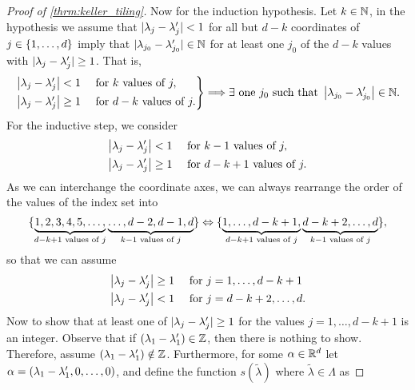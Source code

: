 \documentclass[../thesis.tex]{subfiles}
\begin{document}
\begin{proof}[Proof of \cref{thrm:keller_tiling}]
    Now for the induction hypothesis. Let $k\in \mathbb{N}$, in the hypothesis we assume that $|\lambda_{j}-\lambda_{j}'| < 1$ for all but $d-k$ coordinates of $j\in\{1,\dots, d\}$ imply that $|\lambda_{j_0}-\lambda_{j_0}'| \in \mathbb{N}$ for at least one $j_0$ of the $d-k$ values with $|\lambda_{j}-\lambda_{j}'| \geq 1$. That is,
    \begin{align*}
        \begin{rcases}
            \left|\lambda_{j}-\lambda_{j}'\right| < 1 & \text{ for $k$ values of } j , \\
            \left|\lambda_{j}-\lambda_{j}'\right| \geq 1 & \text{ for $d-k$ values of } j .
        \end{rcases}
        \Longrightarrow \exists \text{ one } j_0 \text{ such that } \left|\lambda_{j_0}-\lambda_{j_0}'\right| \in \mathbb{N}.
    \end{align*}
    For the inductive step, we consider
    \begin{align*}
        \left|\lambda_{j}-\lambda_{j}'\right| < 1& \quad \text{ for $k-1$ values of } j , \\
        \left|\lambda_{j}-\lambda_{j}'\right| \geq 1& \quad \text{ for $d-k+1$ values of } j .
    \end{align*}
    As we can interchange the coordinate axes, we can always rearrange the order of the values of the index set into
    \begin{equation*}
        \{\underbrace{1,2,3,4,5,\dots,}_{d-k+1 \text{ values of $j$}}\underbrace{\dots,d-2,d-1,d}_{k-1 \text{ values of $j$}}\} \Leftrightarrow \{\underbrace{1,\dots,d-k+1,}_{d-k+1 \text{ values of $j$}}\underbrace{d-k+2,\dots,d}_{k-1 \text{ values of $j$}}\},
    \end{equation*} 
    so that we can assume
    \begin{align*}
        \left|\lambda_{j}-\lambda_{j}'\right| \geq 1& \quad \text{ for } j=1,\dots,d-k+1 \\
        \left|\lambda_{j}-\lambda_{j}'\right| < 1& \quad \text{ for } j= d-k+2,\dots,d.
    \end{align*}
    Now to show that at least one of $|\lambda_{j}-\lambda_{j}'| \geq 1$ for the values $j=1,\dots,d-k+1$ is an integer. Observe that if $(\lambda_{1}-\lambda_{1}')\in\mathbb{Z}$, then there is nothing to show. Therefore, assume $(\lambda_{1}-\lambda_{1}') \notin \mathbb{Z}$. Furthermore, for some $\alpha\in\mathbb{R}^d$ let $\alpha = (\lambda_{1}-\lambda_{1}',0,\dots,0)$, and define the function $s(\tilde{\lambda})$ where $\tilde{\lambda}\in \Lambda$ as

\end{proof}
\end{document}
